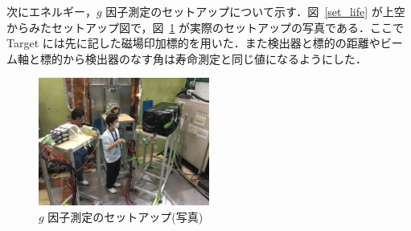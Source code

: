 次にエネルギー，$g$ 因子測定のセットアップについて示す．図~\ref{set_life} が上空からみたセットアップ図で，図~\ref{set_g_2} が実際のセットアップの写真である．ここでTarget には先に記した磁場印加標的を用いた．また検出器と標的の距離やビーム軸と標的から検出器のなす角は寿命測定と同じ値になるようにした．
\begin{figure}[H]
\centering
\includegraphics[width=0.5\textwidth]{figure/tajima/g.jpg}
\caption{$g$ 因子測定のセットアップ(写真)}
\label{set_g_2}
\end{figure}

